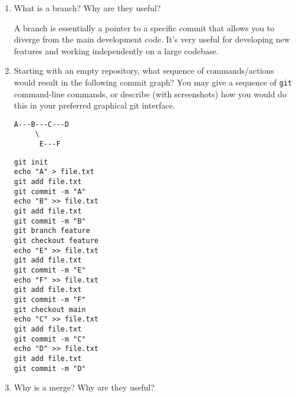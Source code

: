 \documentclass[10pt,twocolumn]{article}
\begin{document}
\begin{enumerate}
\item What is a branch? Why are they useful?

A branch is essentially a pointer to a specific commit that allows you to diverge from the main development code. It's very useful for developing new features and working independently on a large codebase.
\item Starting with an empty repository, what sequence of commands/actions would result in the following commit graph? You may give a sequence of \texttt{git} command-line commands, or describe (with screenshots) how you would do this in your preferred graphical git interface.
\begin{verbatim}
A---B---C---D
     \
      E---F
\end{verbatim}

\texttt{git init}\\
\texttt{echo "A" > file.txt}\\
\texttt{git add file.txt}\\
\texttt{git commit -m "A"}\\
\texttt{echo "B" >> file.txt}\\
\texttt{git add file.txt}\\
\texttt{git commit -m "B"}\\
\texttt{git branch feature}\\
\texttt{git checkout feature}\\
\texttt{echo "E" >> file.txt}\\
\texttt{git add file.txt}\\
\texttt{git commit -m "E"}\\
\texttt{echo "F" >> file.txt}\\
\texttt{git add file.txt}\\
\texttt{git commit -m "F"}\\
\texttt{git checkout main}\\
\texttt{echo "C" >> file.txt}\\
\texttt{git add file.txt}\\
\texttt{git commit -m "C"}\\
\texttt{echo "D" >> file.txt}\\
\texttt{git add file.txt}\\
\texttt{git commit -m "D"}\\
\item Why is a merge? Why are they useful?


\end{enumerate}
\end{document}
